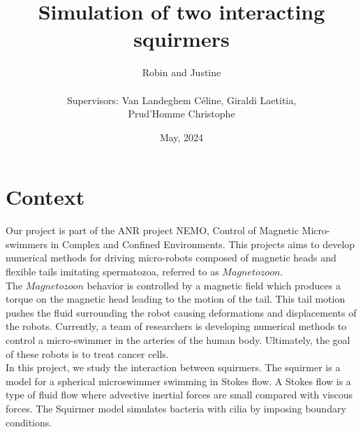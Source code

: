 \documentclass{article}
\begin{document}
\title{Simulation of two interacting squirmers}
\author{Robin and Justine\\
\\
Supervisors: Van Landeghem Céline, Giraldi Laetitia,\\ Prud'Homme Christophe}
\date{May, 2024}
\maketitle

\tableofcontents

\section{Context}
Our project is part of the ANR project NEMO, Control of Magnetic Micro-swimmers in Complex and Confined Environments.
This projects aims to develop numerical methods for driving micro-robots composed of magnetic heads and flexible tails imitating spermatozoa, referred to as $Magnetozoon$.\cite{Nemov10}\\
The $Magnetozoon$ behavior is controlled by a magnetic field which produces a torque on the magnetic head leading to the motion of the tail.
This tail motion pushes the fluid surrounding the robot causing deformations and displacements of the robots.
Currently, a team of researchers is developing numerical methods to control a micro-swimmer in the arteries
of the human body. Ultimately, the goal of these robots is to treat cancer cells. \\
In this project, we study the interaction between squirmers. The squirmer is a model for a spherical microswimmer swimming in Stokes flow. \cite{Wikipedia}
A Stokes flow is a type of fluid flow where advective inertial forces are small compared with viscous forces.
The Squirmer model simulates bacteria with cilia by imposing boundary conditions.


\vspace{0.5cm}
\end{document}

